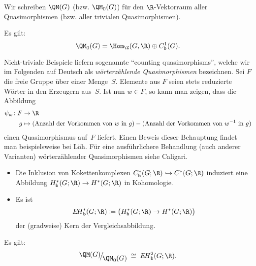 \begin{thDef}
    Wir schreiben $\QM(G)$ (bzw. $\QM_0(G)$) für den $\R$-Vektorraum aller
    Quasimorphismen (bzw. aller trivialen Quasimorphismen). 
\end{thDef}

\begin{thProposition}
    Es gilt:
    \[ \QM_0(G) = \Hom_\Z(G,\R) \oplus \Cb^1(G)  . \]
\end{thProposition}

\begin{thBeispiel}
    Nicht-triviale Beispiele liefern sogenannte \enquote{counting
    quasimorphisms}, welche wir im Folgenden auf Deutsch als
    \emph{wörterzählende Quasimorphismen} bezeichnen. Sei $F$ die freie Gruppe
    über einer Menge~$S$. Elemente aus $F$ seien stets reduzierte Wörter in den
    Erzeugern aus~$S$. Ist nun $w\in F$, so kann man zeigen, dass die Abbildung
    \begin{align*}
        \psi_w\colon F &\to \R  \\
        g &\mapsto (\text{Anzahl der Vorkommen von $w$ in $g$})
                 - (\text{Anzahl der Vorkommen von $w^{-1}$ in $g$})
    \end{align*}
    einen Quasimorphismus auf~$F$ liefert. Einen Beweis dieser Behauptung findet
    man beispielsweise bei
    Löh\cite[Ch.\,2,.3,\;Lemma~2.5.11]{lecnotes:loeh:bdcoho}.
    Für eine ausführlichere Behandlung (auch anderer Varianten) wörterzählender
    Quasimorphismen siehe Caligari\cite[Ch.\,2,.2]{bookc:calegari09}.
\end{thBeispiel}

\begin{thErinnerDef}[Vergleichsabbildung] \hfill
    \begin{itemize}
        \item
            Die Inklusion von Kokettenkomplexen $\Cb^\ast(G;\R) \hookrightarrow
            C^\ast(G;\R)$ induziert eine Abbildung $\Hb^\ast(G;\R) \to
            H^\ast(G;\R)$ in Kohomologie.
        \item
            Es ist
            \[ \EHb^\ast(G;\R)
                \defeq \ker\bigl( \Hb^\ast(G;\R) \to H^\ast(G;\R) \bigr)
            \]
            der (gradweise) Kern der Vergleichsabbildung.
    \end{itemize}
\end{thErinnerDef}

\begin{thSatz}
    Es gilt:
    \[ \Quot{\QM(G)}{\QM_0(G)} \;\cong\; \EHb^2(G;\R)  . \]
\end{thSatz}

